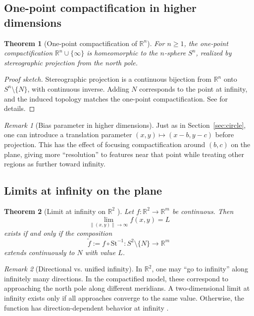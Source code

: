 \documentclass[12pt]{article}
\newtheorem{theorem}{Theorem}
\theoremstyle{remark}
\newtheorem*{remark}{Remark}
\begin{document}
\subsection{One-point compactification in higher dimensions}

\begin{theorem}[One-point compactification of $\mathbb{R}^n$]\label{thm:onepoint}
For $n\geq 1$, the one-point compactification $\mathbb{R}^n\cup\{\infty\}$ is 
homeomorphic to the $n$-sphere $S^n$, realized by stereographic projection from 
the north pole.
\end{theorem}

\begin{proof}[Proof sketch]
Stereographic projection is a continuous bijection from $\mathbb{R}^n$ onto 
$S^n\setminus\{N\}$, with continuous inverse. Adding $N$ corresponds to the 
point at infinity, and the induced topology matches the one-point 
compactification. See \citet{Munkres2000,Hatcher2002} for details.
\end{proof}

\begin{remark}[Bias parameter in higher dimensions]
Just as in Section~\ref{sec:circle}, one can introduce a translation parameter 
$(x,y)\mapsto(x-b,y-c)$ before projection. This has the effect of focusing 
compactification around $(b,c)$ on the plane, giving more “resolution” to features 
near that point while treating other regions as further toward infinity.  
\end{remark}

\subsection{Limits at infinity on the plane}

\begin{theorem}[Limit at infinity on $\mathbb{R}^2$ {\citep{RudinRealComplex}}]\label{thm:R2limit}
Let $f:\mathbb{R}^2\to\mathbb{R}^m$ be continuous. Then 
\[
\lim_{\|(x,y)\|\to\infty} f(x,y)=L
\]
exists if and only if the composition
\[
\tilde f := f\circ \mathrm{St}^{-1}: S^2\setminus\{N\}\to \mathbb{R}^m
\]
extends continuously to $N$ with value $L$.
\end{theorem}

\begin{remark}[Directional vs. unified infinity]
In $\mathbb{R}^2$, one may “go to infinity” along infinitely many directions. 
In the compactified model, these correspond to approaching the north pole along 
different meridians. A two-dimensional limit at infinity exists only if all 
approaches converge to the same value. Otherwise, the function has 
direction-dependent behavior at infinity \citep{AhlforsComplex}.
\end{remark}
\end{document}
